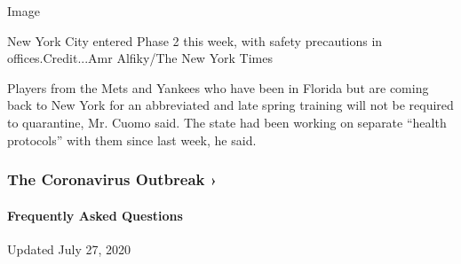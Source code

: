 Image

New York City entered Phase 2 this week, with safety precautions in
offices.Credit...Amr Alfiky/The New York Times

Players from the Mets and Yankees who have been in Florida but are
coming back to New York for an abbreviated and late spring training will
not be required to quarantine, Mr. Cuomo said. The state had been
working on separate ``health protocols'' with them since last week, he
said.

\href{https://www.nytimes.com/news-event/coronavirus?action=click\&pgtype=Article\&state=default\&region=MAIN_CONTENT_3\&context=storylines_faq}{}

\hypertarget{the-coronavirus-outbreak-}{%
\subsubsection{The Coronavirus Outbreak
›}\label{the-coronavirus-outbreak-}}

\hypertarget{frequently-asked-questions}{%
\paragraph{Frequently Asked
Questions}\label{frequently-asked-questions}}

Updated July 27, 2020

